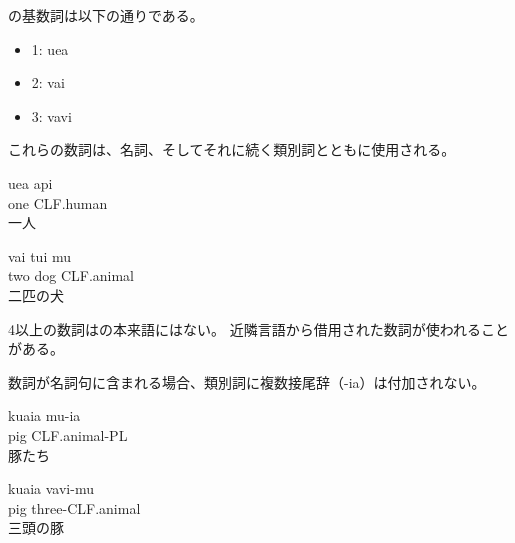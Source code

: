 \langname の基数詞は以下の通りである。
\begin{itemize}
    \item 1: uea
    \item 2: vai
    \item 3: vavi
\end{itemize}

これらの数詞は、名詞、そしてそれに続く類別詞とともに使用される。
\begin{exe}
    \ex \gll uea api \\
    one CLF.human \\
    \glt 一人
\end{exe}
\begin{exe}
    \ex \gll vai tui mu \\
    two dog CLF.animal \\
    \glt 二匹の犬
\end{exe}

4以上の数詞は\langname の本来語にはない。
近隣言語から借用された数詞が使われることがある。


数詞が名詞句に含まれる場合、類別詞に複数接尾辞（-ia）は付加されない。
\begin{exe}
    \ex \gll kuaia mu-ia \\
    pig CLF.animal-PL \\
    \glt 豚たち
\end{exe}
\begin{exe}
    \ex \gll kuaia vavi-mu \\
    pig three-CLF.animal \\
    \glt 三頭の豚
\end{exe}

